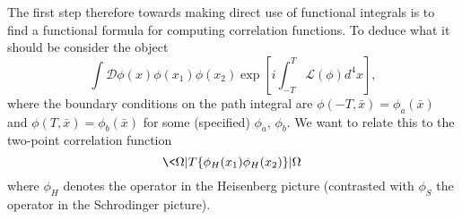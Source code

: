 The first step therefore towards making direct use of functional
integrals is to find a functional formula for computing
correlation functions. To deduce what it should be consider the
object
\begin{equation}\label{eq:functionalIntegralCorrelationFunction}
\int\mathcal{D}\phi(x)\phi(x_1)\phi(x_2)\exp\left[i\int^{T}_{-T}\mathcal{L}(\phi)d^{4}x\right],
\end{equation}
where the boundary conditions on the path integral are
$\phi(-T,\bar{x})=\phi_{a}(\bar{x})$ and
$\phi(T,\bar{x})=\phi_{b}(\bar{x})$ for some (specified)
$\phi_a$, $\phi_b$. We want to relate this to the two-point
correlation function
\begin{equation}%
\<\Omega|T\{\phi_{H}(x_1)\phi_{H}(x_2)\}|\Omega\>
\end{equation}
where $\phi_H$ denotes the operator in the Heisenberg picture
(contrasted with $\phi_S$ the operator in the Schrodinger
picture). 

